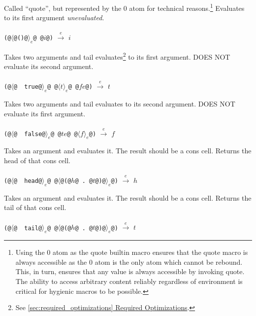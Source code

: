\documentclass[twocolumn]{report}
\newcommand{\intralink}[2]{\hyperref[#1]{\ref*{#1} #2}}
\begin{document}
\begin{description}[leftmargin=1.5cm,labelwidth=1.3cm]
\item [\texttt{()}]
Called ``quote'', but represented by the $0$ atom for technical reasons.\footnote{Using the $0$ atom as the quote builtin macro ensures that the quote macro is always accessible as the $0$ atom is the only atom which cannot be rebound. This, in turn, ensures that any value is always accessible by invoking quote. The ability to access arbitrary content reliably regardless of environment is critical for hygienic macros to be possible.}
Evaluates to its first argument \emph{unevaluated}. \\
\\
\texttt{(@$\langle$@()@$\rangle_{e}$@ @$i$@)} $\xrightarrow{e}$ $i$

\item [\texttt{~~true}]
Takes two arguments and tail evaluates\footnote{See \intralink{sec:required_optimizations}{Required Optimizations}.} to its first argument. DOES NOT evaluate its second argument. \\
\\
\texttt{(@$\langle$@~~true@$\rangle_{e}$@ @$\langle t \rangle_{e}$@ @$fe$@)} $\xrightarrow{e}$ $t$

\item [\texttt{~~false}]
Takes two arguments and tail evaluates to its second argument. DOES NOT evaluate its first argument. \\
\\
\texttt{(@$\langle$@~~false@$\rangle_{e}$@ @$te$@ @$\langle f \rangle_{e}$@)} $\xrightarrow{e}$ $f$

\item [\texttt{~~head}]
Takes an argument and evaluates it.
The result should be a cons cell.
Returns the head of that cons cell. \\
\\
\texttt{(@$\langle$@~~head@$\rangle_{e}$@ @$\langle$@(@$h$@ . @$t$@)@$\rangle_{e}$@)} $\xrightarrow{e}$ $h$

\item [\texttt{~~tail}]
Takes an argument and evaluates it.
The result should be a cons cell.
Returns the tail of that cons cell. \\
\\
\texttt{(@$\langle$@~~tail@$\rangle_{e}$@ @$\langle$@(@$h$@ . @$t$@)@$\rangle_{e}$@)} $\xrightarrow{e}$ $t$


\end{description}
\end{document}
